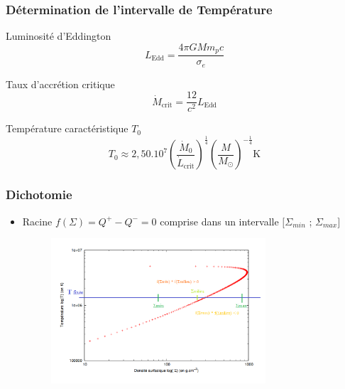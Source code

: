 \begin{frame}
\frametitle{Détermination de l'intervalle de Température} 
Luminosité d'Eddington
   \begin{equation}
      L_\mathrm{Edd} = \frac{4\pi GMm_pc}{\sigma_e}
   \end{equation}

Taux d’accrétion critique 
   \begin{equation}
      \dot{M}_\mathrm{crit} = \frac{12}{c^2}L_\mathrm{Edd} 
   \end{equation}

Température caractéristique $T_0$
   \begin{equation}
      T_0 \approx 2,50.10^7\left(\frac{\dot{M}_0}{\dot{L}_\mathrm{crit}}\right)^{\frac{1}{4}}\left(\frac{M}{M_\odot}\right)^{-\frac{1}{4}} \mathrm{K}
   \end{equation}


\end{frame}






   
    




\begin{frame}
\frametitle{Dichotomie}

   \begin{itemize}
      \item Racine $f(\Sigma) = Q^+ - Q^- = 0$ comprise dans un intervalle $[\Sigma_{min}$ ; $\Sigma_{max}]$
      \\
      \begin{figure}[htb!]
         \includegraphics[width=8cm]{figures/dicho_1.png}
      \end{figure}
   \end{itemize}
\end{frame}

